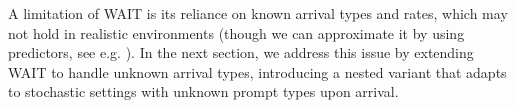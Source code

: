






A limitation of WAIT is its reliance on known arrival types and rates, which may not hold in realistic environments (though we can approximate it by using predictors, see e.g. \citep{fu2025efficient}). In the next section, we address this issue by extending WAIT to handle unknown arrival types, introducing a nested variant that adapts to stochastic settings with unknown prompt types upon arrival.